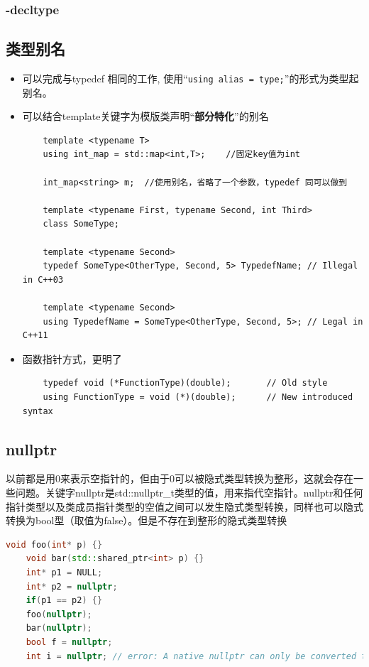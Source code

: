 \documentclass[UTF8,a4paper,12pt]{ctexbook} %
\begin{document}
			\subsubsection{-decltype}
			
		\subsection{类型别名}
			\begin{itemize}
				\item 可以完成与typedef 相同的工作,  使用“\verb|using alias = type;|”的形式为类型起别名。
				\item 可以结合template关键字为模版类声明“\textbf{部分特化}”的别名
			\begin{lstlisting}
	template <typename T>
	using int_map = std::map<int,T>;	//固定key值为int
	
	int_map<string> m;	//使用别名，省略了一个参数，typedef 同可以做到
	
	template <typename First, typename Second, int Third>
	class SomeType;
	
	template <typename Second>
	typedef SomeType<OtherType, Second, 5> TypedefName; // Illegal in C++03
	
	template <typename Second>
	using TypedefName = SomeType<OtherType, Second, 5>; // Legal in C++11			
			\end{lstlisting}
				\item 函数指针方式，更明了
			\begin{lstlisting}
	typedef void (*FunctionType)(double);       // Old style
	using FunctionType = void (*)(double);      // New introduced syntax			
			\end{lstlisting}
			
			\end{itemize}						
		\subsection{nullptr}
			以前都是用0来表示空指针的，但由于0可以被隐式类型转换为整形，这就会存在一些问题。关键字nullptr是std::nullptr\_t类型的值，用来指代空指针。nullptr和任何指针类型以及类成员指针类型的空值之间可以发生隐式类型转换，同样也可以隐式转换为bool型（取值为false）。但是不存在到整形的隐式类型转换
		
				\begin{lstlisting}[language=C++]
	void foo(int* p) {}
	void bar(std::shared_ptr<int> p) {}
	int* p1 = NULL;
	int* p2 = nullptr;   
	if(p1 == p2) {}
	foo(nullptr);
	bar(nullptr);
	bool f = nullptr;
	int i = nullptr; // error: A native nullptr can only be converted to bool or, using reinterpret_cast, to an integral type					
				\end{lstlisting}
		
\end{document}
